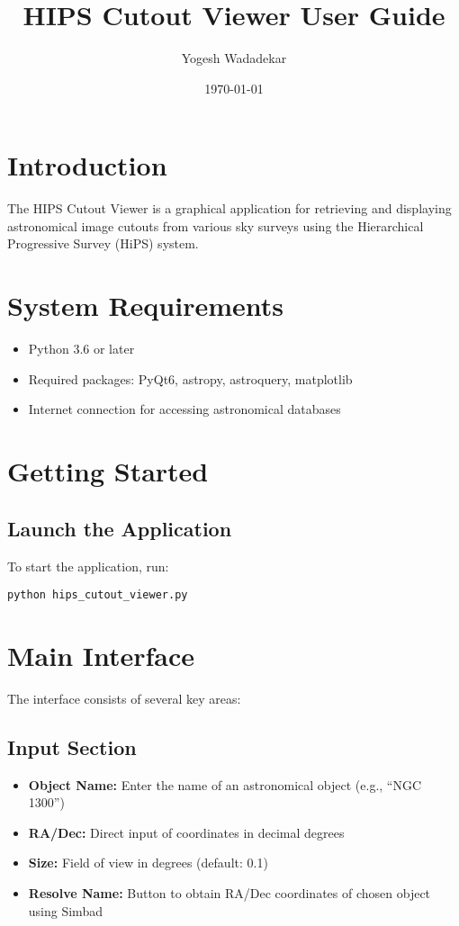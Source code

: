 \documentclass{article}
\title{HIPS Cutout Viewer User Guide}
\author{Yogesh Wadadekar}
\date{\today}
\begin{document}
\maketitle

\section{Introduction}
The HIPS Cutout Viewer is a graphical application for retrieving and displaying astronomical image cutouts from various sky surveys using the Hierarchical Progressive Survey (HiPS) system.

\section{System Requirements}
\begin{itemize}
    \item Python 3.6 or later
    \item Required packages: PyQt6, astropy, astroquery, matplotlib
    \item Internet connection for accessing astronomical databases
\end{itemize}

\section{Getting Started}
\subsection{Launch the Application}
To start the application, run:
\begin{verbatim}
python hips_cutout_viewer.py
\end{verbatim}

\section{Main Interface}
The interface consists of several key areas:

\subsection{Input Section}
\begin{itemize}
    \item \textbf{Object Name:} Enter the name of an astronomical object (e.g., ``NGC 1300'')
    \item \textbf{RA/Dec:} Direct input of coordinates in decimal degrees
    \item \textbf{Size:} Field of view in degrees (default: 0.1)
    \item \textbf{Resolve Name:} Button to obtain RA/Dec coordinates of chosen object using Simbad
\end{itemize}
\end{document}
